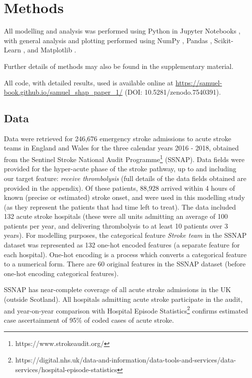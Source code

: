 \renewcommand{\thefootnote}{\alph{footnote}} %

\section{Methods}

All modelling and analysis was performed using Python in Jupyter Notebooks \cite{kluyver_jupyter_2016}, with general analysis and plotting performed using NumPy \cite{harris_array_2020}, Pandas \cite{mckinney-proc-scipy-2010}, Scikit-Learn  \cite{pedregosa_scikit-learn_2011}, and Matplotlib \cite{hunter_matplotlib_2007}. 

Further details of methods may also be found in the supplementary material. 

All code, with detailed results, used is available online at \url{https://samuel-book.github.io/samuel_shap_paper_1/} (DOI: 10.5281/zenodo.7540391). 

\subsection{Data}

Data were retrieved for 246,676 emergency stroke admissions to acute stroke teams in England and Wales for the three calendar years 2016 - 2018, obtained from the Sentinel Stroke National Audit Programme\footnote{https://www.strokeaudit.org/} (SSNAP). Data fields were provided for the hyper-acute phase of the stroke pathway, up to and including our target feature: \emph{receive thrombolysis} (full details of the data fields obtained are provided in the appendix). Of these patients, 88,928 arrived within 4 hours of known (precise or estimated) stroke onset, and were used in this modelling study (as they represent the patients that had time left to treat). The data included 132 acute stroke hospitals (these were all units admitting an average of 100 patients per year, and delivering thrombolysis to at least 10 patients over 3 years). For modelling purposes, the categorical feature \emph{Stroke team} in the SSNAP dataset was represented as 132 one-hot encoded features (a separate feature for each hospital). One-hot encoding is a process which converts a categorical feature to a numerical form. There are 60 original features in the SSNAP dataset (before one-hot encoding categorical features).

 SSNAP has near-complete coverage of all acute stroke admissions in the UK (outside Scotland). All hospitals admitting acute stroke participate in the audit, and year-on-year comparison with Hospital Episode Statistics\footnote{https://digital.nhs.uk/data-and-information/data-tools-and-services/data-services/hospital-episode-statistics} confirms estimated case ascertainment of 95\% of coded cases of acute stroke.

